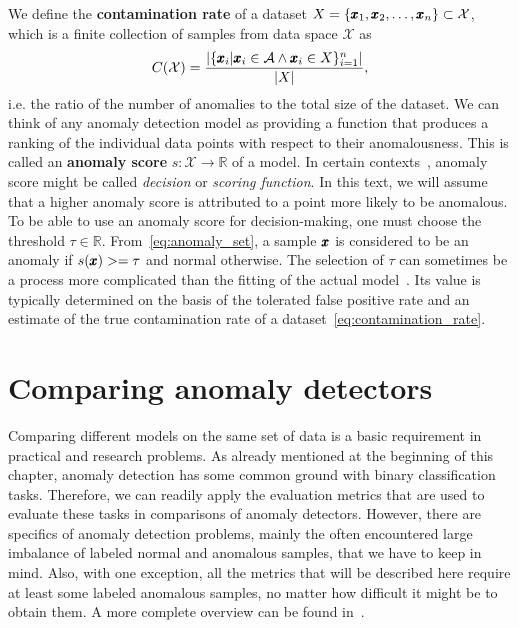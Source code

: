 We define the \textbf{contamination rate} of a dataset $X = \lbrace \pmb{{x}}_1, \pmb{{x}}_2, \ldots, \pmb{{x}}_n \rbrace \subset \mathcal{X}$, which is a finite collection of samples from data space $\mathcal{X}$ as
\begin{equation} \label{eq:contamination_rate}
C(\mathcal{X})=\frac{|\{\pmb{{x}}_{i}|\pmb{{x}}_{i}\in \mathcal{A} \wedge \pmb{{x}}_i \in X \}_{i=1}^n|}{|X|},
\end{equation}
i.e. the ratio of the number of anomalies to the total size of the dataset. We can think of any anomaly detection model as providing a function that produces a ranking of the individual data points with respect to their anomalousness. This is called an \textbf{anomaly score} $s:\mathcal{X}\rightarrow\mathbb{R}$ of a model. In certain contexts~\cite{pedregosa2011scikit}, anomaly score might be called \textit{decision }or \textit{scoring function}. In this text, we will assume that a higher anomaly score is attributed to a point more likely to be anomalous. To be able to use an anomaly score for decision-making, one must choose the threshold $\tau\in\mathbb{R}$. From~\eqref{eq:anomaly_set}, a sample $\pmb{{x}}$ is considered to be an anomaly if $s(\pmb{{x}})>=\tau$ and normal otherwise. The selection of $\tau$ can sometimes be a process more complicated than the fitting of the actual model~\cite{ali2013automated}.  Its value is typically determined on the basis of the tolerated false positive rate and an estimate of the true contamination rate of a dataset~\eqref{eq:contamination_rate}.


\section{Comparing anomaly detectors}
Comparing different models on the same set of data is a basic requirement in practical and research problems. As already mentioned at the beginning of this chapter, anomaly detection has some common ground with binary classification tasks. Therefore, we can readily apply the evaluation metrics that are used to evaluate these tasks in comparisons of anomaly detectors. However, there are specifics of anomaly detection problems, mainly the often encountered large imbalance of labeled normal and anomalous samples, that we have to keep in mind. Also, with one exception, all the metrics that will be described here require at least some labeled anomalous samples, no matter how difficult it might be to obtain them. A more complete overview can be found in~\cite{sokolova2006beyond}.

